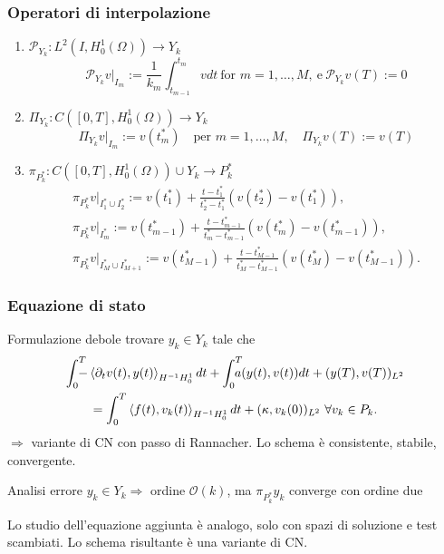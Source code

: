 \documentclass{beamer}
\theoremstyle{definition}
\theoremstyle{remark}
\theoremstyle{plain}
\theoremstyle{definition}
\begin{document}
\begin{frame}
\frametitle{Operatori di interpolazione}
\begin{enumerate}[<+->]
\item $\mathcal{P}_{Y_{k}}:L^2(I,H^1_0(\Omega))\to Y_k$
\[
\mathcal{P}_{Y_{k}} v|_{I_{m}}:=\frac{1}{k_{m}} \int^{t_{m}}_{t_{m-1}}vdt \ \text{for $m=1,\dots,M$}, \ \text{e}\ \mathcal{P}_{Y_{k}}v(T):=0
\]
\item $\Pi_{Y_{k}}:C([0,T],H^1_0(\Omega))\to Y_k$
\[
\Pi_{Y_{k}} v|_{I_{m}}:=v(t^*_m)\quad\text{per $m=1,\dots,M$},\quad \Pi_{Y_{k}} v(T):=v(T)
\]
\item $\pi_{P^*_k}:C([0,T],H^1_0(\Omega))\cup Y_k\to P^*_k$
\begin{gather*}
\pi_{P^*_k} v|_{I^*_1\cup I^*_2}:=v(t^*_1)+\frac{t-t^*_1}{t^*_2-t^*_1}(v(t^*_2)-v(t^*_1)),\\
\pi_{P^*_k} v|_{I^*_m}:=v(t^*_{m-1})+\frac{t-t^*_{m-1}}{t^*_{m}-t^*_{m-1}}(v(t^*_m)-v(t^*_{m-1})),\\
\pi_{P^*_k} v|_{I^*_M\cup I^*_{M+1}}:=v(t^*_{M-1})+\frac{t-t^*_{M-1}}{t^*_M-t^*_{M-1}}(v(t^*_M)-v(t^*_{M-1})).
\end{gather*}
\end{enumerate} 
\end{frame}

\begin{frame}
\frametitle{Equazione di stato}
Formulazione debole
trovare $y_k\in Y_k$ tale che 
\begin{multline}
 \int_{0}^{T}\!\!\!\!\! -\left \langle {\partial_{t}}v(t),y(t) \right \rangle_{{H^{-1}}{H^{1}_{0}}} dt + \int_{0}^{T}\!\!\!\!\! a(y(t),v(t)) dt + (y(T),v(T))_{L^{2}} \\
=\int^{T}_{0} \Braket{f(t),v_k(t)}_{H^{-1}H^1_0}dt + (\kappa,v_k(0))_{L^2}\ \forall v_k\in P_k.
\end{multline}
$ \Rightarrow $ variante di CN con passo di Rannacher. Lo schema è consistente, stabile, convergente.
\begin{block}{Analisi errore}
$y_k\in Y_k\Rightarrow$  ordine $\mathcal{O}(k)$, ma $ \pi_{P^*_k}y_k $ converge con ordine due
\end{block}
Lo studio dell'equazione aggiunta è analogo, solo con spazi di soluzione e test scambiati. Lo schema risultante è una variante di CN.
\end{frame}
\end{document}
